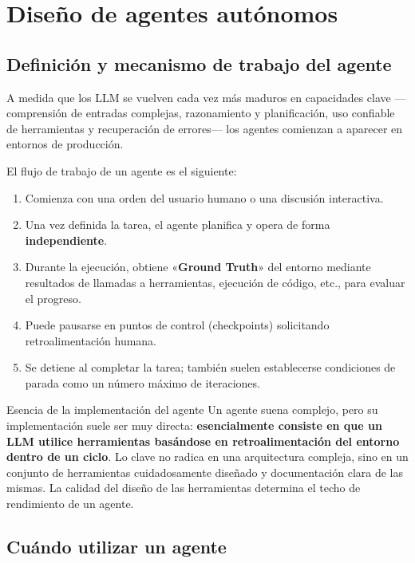 \section{Diseño de agentes autónomos}

\subsection{Definición y mecanismo de trabajo del agente}

A medida que los LLM se vuelven cada vez más maduros en capacidades clave —comprensión de entradas complejas, razonamiento y planificación, uso confiable de herramientas y recuperación de errores— los agentes comienzan a aparecer en entornos de producción.

El flujo de trabajo de un agente es el siguiente:
\begin{enumerate}
    \item Comienza con una orden del usuario humano o una discusión interactiva.
    \item Una vez definida la tarea, el agente planifica y opera de forma \textbf{independiente}.
    \item Durante la ejecución, obtiene «\textbf{Ground Truth}» del entorno mediante resultados de llamadas a herramientas, ejecución de código, etc., para evaluar el progreso.
    \item Puede pausarse en puntos de control (checkpoints) solicitando retroalimentación humana.
    \item Se detiene al completar la tarea; también suelen establecerse condiciones de parada como un número máximo de iteraciones.
\end{enumerate}

\begin{importantbox}{Esencia de la implementación del agente}
Un agente suena complejo, pero su implementación suele ser muy directa: \textbf{esencialmente consiste en que un LLM utilice herramientas basándose en retroalimentación del entorno dentro de un ciclo}. Lo clave no radica en una arquitectura compleja, sino en un conjunto de herramientas cuidadosamente diseñado y documentación clara de las mismas. La calidad del diseño de las herramientas determina el techo de rendimiento de un agente.
\end{importantbox}

\subsection{Cuándo utilizar un agente}

